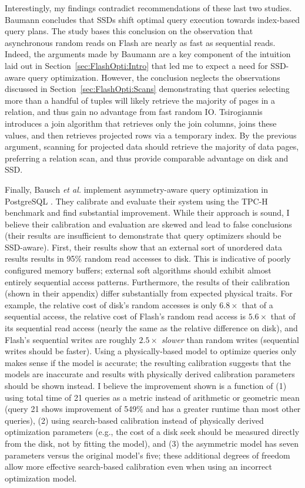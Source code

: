 Interestingly, my findings contradict recommendations of these last two studies.
Baumann concludes that SSDs shift optimal query execution towards index-based query plans.
The study bases this conclusion on the observation that asynchronous random reads on Flash are nearly as fast as sequential reads.
Indeed, the arguments made by Baumann are a key component of the intuition laid out in Section~\ref{sec:FlashOpti:Intro} that led me to expect a need for SSD-aware query optimization.
However, the conclusion neglects the observations discussed in Section~\ref{sec:FlashOpti:Scans} demonstrating that queries selecting more than a handful of tuples will likely retrieve the majority of pages in a relation, and thus gain no advantage from fast random IO.
Tsirogiannis introduces a join algorithm that retrieves only the join columns, joins these values, and then retrieves projected rows via a temporary index.
By the previous argument, scanning for projected data should retrieve the majority of data pages, preferring a relation scan, and thus provide comparable advantage on disk and SSD.

Finally, Bausch \emph{et al.} implement asymmetry-aware query optimization in PostgreSQL \cite{BauschPetrov12}.
They calibrate and evaluate their system using the TPC-H benchmark and find substantial improvement.
While their approach is sound, I believe their calibration and evaluation are skewed and lead to false conclusions (their results are insufficient to demonstrate that query optimizers should be SSD-aware).
First, their results show that an external sort of unordered data results results in 95\% random read accesses to disk.
This is indicative of poorly configured memory buffers; external soft algorithms should exhibit almost entirely sequential access patterns.
Furthermore, the results of their calibration (shown in their appendix) differ substantially from expected physical traits.
For example, the relative cost of disk's random accesses is only $6.8\times$ that of a sequential access, the relative cost of Flash's random read access is $5.6\times$ that of its sequential read access (nearly the same as the relative difference on disk), and Flash's sequential writes are roughly $2.5\times$ \emph{slower} than random writes (sequential writes should be faster).
Using a physically-based model to optimize queries only makes sense if the model is accurate; the resulting calibration suggests that the models are inaccurate and results with physically derived calibration parameters should be shown instead.
I believe the improvement shown is a function of (1) using total time of 21 queries as a metric instead of arithmetic or geometric mean (query 21 shows improvement of 549\% and has a greater runtime than most other queries), (2) using search-based calibration instead of physically derived optimization parameters (e.g., the cost of a disk seek should be measured directly from the disk, not by fitting the model), and (3) the asymmetric model has seven parameters versus the original model's five; these additional degrees of freedom allow more effective search-based calibration even when using an incorrect optimization model.

